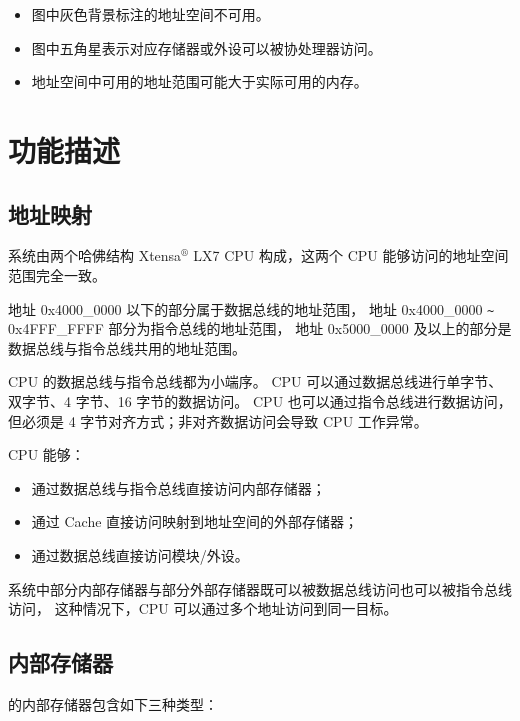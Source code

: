 \documentclass[main\_\_CN.tex]{subfiles}
\begin{document}
\begin{tiplisting}
\vspace{-2em}
\begin{itemize}
    \item 图中灰色背景标注的地址空间不可用。
    \item 图中五角星表示对应存储器或外设可以被协处理器访问。
    \item 地址空间中可用的地址范围可能大于实际可用的内存。
\end{itemize}

\end{tiplisting}

\section{功能描述}

\subsection{地址映射}

系统由两个哈佛结构 Xtensa$^®$ LX7 CPU 构成，这两个 CPU 能够访问的地址空间范围完全一致。

地址 0x{}4000\_0000 以下的部分属于数据总线的地址范围，
地址 0x{}4000\_0000 \verb+~+ 0x{}4FFF\_FFFF 部分为指令总线的地址范围，
地址 0x{}5000\_0000 及以上的部分是数据总线与指令总线共用的地址范围。

CPU 的数据总线与指令总线都为小端序。
CPU 可以通过数据总线进行单字节、双字节、4 字节、16 字节的数据访问。
CPU 也可以通过指令总线进行数据访问，但必须是 4 字节对齐方式；非对齐数据访问会导致 CPU 工作异常。

CPU 能够：
\begin{itemize}
\item 通过数据总线与指令总线直接访问内部存储器；
\item 通过 Cache 直接访问映射到地址空间的外部存储器；
\item 通过数据总线直接访问模块/外设。
\end{itemize}

系统中部分内部存储器与部分外部存储器既可以被数据总线访问也可以被指令总线访问，
这种情况下，CPU 可以通过多个地址访问到同一目标。

\subsection{内部存储器}
\label{para:sysmem-embedded memory}

\chipname{} 的内部存储器包含如下三种类型：
\end{document}
